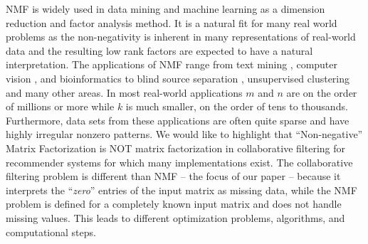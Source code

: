NMF is widely used in data mining and machine learning as a dimension reduction and factor analysis method.
It is a natural fit for many real world problems as the non-negativity is inherent in many representations of real-world data and
the resulting low rank factors are expected to have a natural interpretation. The applications of NMF range from text mining \cite{pauca2004text},  computer vision \cite{hoyer2004non}, and bioinformatics \cite{kim2007sparse} to blind source separation  \cite{cichocki2009nonnegative}, unsupervised clustering \cite{kuang2012symmetric,kuang2013symnmf}  and many other areas.
In most real-world applications $m$ and $n$ are on the order of millions or more while $k$ is much smaller, on the order of tens to thousands. Furthermore, data sets from these applications are often quite sparse and have highly irregular nonzero patterns.
We would like to highlight that ``Non-negative'' Matrix Factorization is NOT matrix factorization in collaborative filtering for recommender systems for which many implementations exist.
The collaborative filtering problem is different than NMF -- the focus of our paper -- because it interprets the ``{\em zero}'' entries of the input matrix as missing data, while the NMF problem is defined for a completely known input matrix and does not handle missing values.
This leads to different optimization problems, algorithms, and computational steps.





